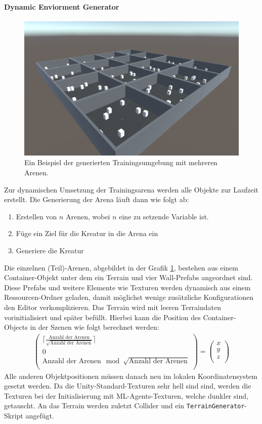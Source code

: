 \paragraph{Dynamic Enviorment Generator}
\begin{figure}
	\centering
	\includegraphics[width=0.7\linewidth]{resources/img/DEGArenen}
	\caption[Beispiel der generierten Trainingsumgebung]{Ein Beispiel der generierten Trainingsumgebung mit mehreren Arenen.}
	\label{bspArena}
\end{figure}
Zur dynamischen Umsetzung der Trainingsarena werden alle Objekte zur Laufzeit erstellt. Die Generierung der Arena läuft dann wie folgt ab:
\begin{enumerate}
	\item Erstellen von $n$ Arenen, wobei $n$ eine zu setzende Variable ist. 
	\item Füge ein Ziel für die Kreatur in die Arena ein
	\item Generiere die Kreatur
\end{enumerate} 
Die einzelnen (Teil)-Arenen, abgebildet in der Grafik \ref{bspArena}, bestehen aus einem Container-Objekt unter dem ein Terrain und vier Wall-Prefabs angeordnet sind. Diese Prefabs und weitere Elemente wie Texturen werden dynamisch aus einem Ressourcen-Ordner geladen, damit möglichst wenige zusätzliche Konfigurationen den Editor verkomplizieren. Das Terrain wird mit leeren Terraindaten vorinitialisiert und später befüllt. Hierbei kann die Position des Container-Objects in der Szenen wie folgt berechnet werden:
\begin{align}
	\begin{pmatrix}
	\lceil \frac{\text{Anzahl der Arenen}}{\sqrt{\text{Anzahl der Arenen}}} \rceil \\
	0 \\
	\text{Anzahl der Arenen} \mod \sqrt{\text{Anzahl der Arenen}} \\
	\end{pmatrix}
	 = 	\begin{pmatrix}
	 x  \\
	 y \\
	 z  \\
	 \end{pmatrix}
\end{align}
Alle anderen Objektpositionen müssen danach neu im lokalen Koordinatensystem gesetzt werden. Da die Unity-Standard-Texturen sehr hell sind sind, werden die Texturen bei der Initialisierung mit ML-Agents-Texturen, welche dunkler sind, getauscht. An das Terrain werden zuletzt Collider und ein \texttt{TerrainGenerator}-Skript angefügt. 


